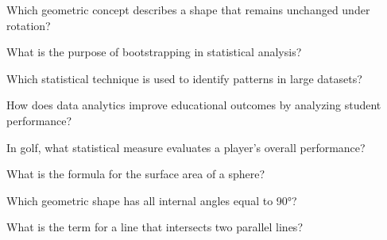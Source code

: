 \begin{enhancedmcq}{Which geometric concept describes a shape that remains unchanged under rotation?}
\end{enhancedmcq}

\begin{enhancedmcq}{What is the purpose of bootstrapping in statistical analysis?}
\end{enhancedmcq}

\begin{enhancedmcq}{Which statistical technique is used to identify patterns in large datasets?}
\end{enhancedmcq}

\begin{enhancedmcq}{How does data analytics improve educational outcomes by analyzing student performance?}
\end{enhancedmcq}

\begin{enhancedmcq}{In golf, what statistical measure evaluates a player's overall performance?}
\end{enhancedmcq}

\begin{enhancedmcq}{What is the formula for the surface area of a sphere?}
\end{enhancedmcq}

\begin{enhancedmcq}{Which geometric shape has all internal angles equal to 90°?}
\end{enhancedmcq}

\begin{enhancedmcq}{What is the term for a line that intersects two parallel lines?}
\end{enhancedmcq}

